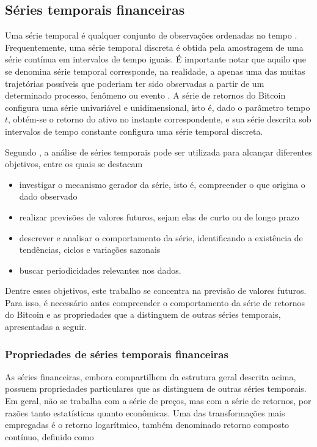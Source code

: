\documentclass[
    12pt,                %
    openright,           %
    oneside,             %
    a4paper,             %
    english,             %
    brazil               %
]{abntex2}
\begin{document}
\subsection{Séries temporais financeiras}

Uma série temporal é qualquer conjunto de observações ordenadas no tempo \cite{morettin2018analise}. Frequentemente, uma série temporal discreta é obtida pela amostragem de uma série contínua em intervalos de tempo iguais. É importante notar que aquilo que se denomina série temporal corresponde, na realidade, a apenas uma das muitas trajetórias possíveis que poderiam ter sido observadas a partir de um determinado processo, fenômeno ou evento \cite{morettin2018analise}. A série de retornos do Bitcoin configura uma série univariável e unidimensional, isto é, dado o parâmetro tempo $t$, obtém-se o retorno do ativo no instante correspondente, e sua série descrita sob intervalos de tempo constante configura uma série temporal discreta.

Segundo , a análise de séries temporais pode ser utilizada para alcançar diferentes objetivos, entre os quais se destacam

\begin{itemize}
    \item investigar o mecanismo gerador da série, isto é, compreender o que origina o dado observado
    \item realizar previsões de valores futuros, sejam elas de curto ou de longo prazo
    \item descrever e analisar o comportamento da série, identificando a existência de tendências, ciclos e variações sazonais
    \item buscar periodicidades relevantes nos dados.
\end{itemize}

Dentre esses objetivos, este trabalho se concentra na previsão de valores futuros. Para isso, é necessário antes compreender 
o comportamento da série de retornos do Bitcoin e as propriedades que a distinguem de outras séries temporais, apresentadas a seguir.

\subsubsection{Propriedades de séries temporais financeiras}

As séries financeiras, embora compartilhem da estrutura geral descrita acima, possuem propriedades particulares que as distinguem de outras séries temporais. Em geral, não se trabalha com a série de preços, mas com a série de retornos, por razões tanto estatísticas quanto econômicas. Uma das transformações mais empregadas é o retorno logarítmico, também denominado retorno composto contínuo, definido como
\end{document}
